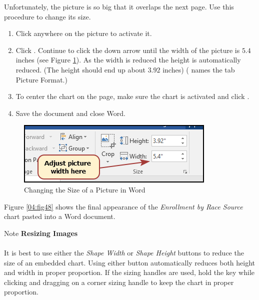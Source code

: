 Unfortunately, the picture is so big that it overlaps the next page. Use this procedure to change its size.

\begin{enumbox}
	\begin{enumerate}
		\item Click anywhere on the picture to activate it.
		\item Click . Continue to click the down arrow until the width of the picture is $ 5.4 $ inches (see Figure \ref{04:fig47}). As the width is reduced the height is automatically reduced. (The height should end up about $ 3.92 $ inches) ( names the tab Picture Format.)
		\item To center the chart on the page, make sure the chart is activated and click . 
		\item Save the document and close Word.
	\end{enumerate}
\end{enumbox}
	
\begin{figure}[H]
	\centering
	\includegraphics[width=\maxwidth{.75\linewidth}]{gfx/ch04_fig47}
	\caption{Changing the Size of a Picture in Word}
	\label{04:fig47}
\end{figure}

Figure \ref{04:fig48} shows the final appearance of the \textit{Enrollment by Race Source} chart pasted into a Word document. 

\begin{center}
	\begin{infobox}{Note}
		\textbf{Resizing Images}
		\\
		\\
		It is best to use either the \textit{Shape Width} or \textit{Shape Height} buttons to reduce the size of an embedded chart. Using either button automatically reduces both height and width in proper proportion. If the sizing handles are used, hold the  key while clicking and dragging on a corner sizing handle to keep the chart in proper proportion.
	\end{infobox}
\end{center}

